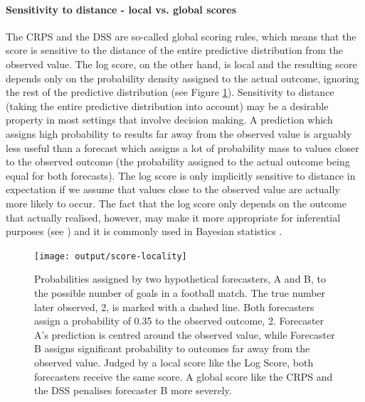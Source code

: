 \documentclass[
]{jss}
\begin{document}
\hypertarget{localglobal}{%
\paragraph{Sensitivity to distance - local vs. global
scores}\label{localglobal}}

The CRPS and the DSS are so-called global scoring rules, which means
that the score is sensitive to the distance of the entire predictive
distribution from the observed value. The log score, on the other hand,
is local and the resulting score depends only on the probability density
assigned to the actual outcome, ignoring the rest of the predictive
distribution (see Figure \ref{fig:score-locality}). Sensitivity to
distance (taking the entire predictive distribution into account) may be
a desirable property in most settings that involve decision making. A
prediction which assigns high probability to results far away from the
observed value is arguably less useful than a forecast which assigns a
lot of probability mass to values closer to the observed outcome (the
probability assigned to the actual outcome being equal for both
forecasts). The log score is only implicitly sensitive to distance in
expectation if we assume that values close to the observed value are
actually more likely to occur. The fact that the log score only depends
on the outcome that actually realised, however, may make it more
appropriate for inferential purposes (see
\citep{winklerScoringRulesEvaluation1996}) and it is commonly used in
Bayesian statistics
\citep{gelmanUnderstandingPredictiveInformation2014}.

\begin{CodeChunk}
\begin{figure}

{\centering \texttt{[image: output/score-locality]}

}

\caption[Probabilities assigned by two hypothetical forecasters, A and B, to the possible number of goals in a football match]{Probabilities assigned by two hypothetical forecasters, A and B, to the possible number of goals in a football match. The true number later observed, 2, is marked with a dashed line. Both forecasters assign a probability of 0.35 to the observed outcome, 2. Forecaster A's prediction is centred around the observed value, while Forecaster B assigns significant probability to outcomes far away from the observed value. Judged by a local score like the Log Score, both forecasters receive the same score. A global score like the CRPS and the DSS penalises forecaster B more severely.}\label{fig:score-locality}
\end{figure}
\end{CodeChunk}
\end{document}

